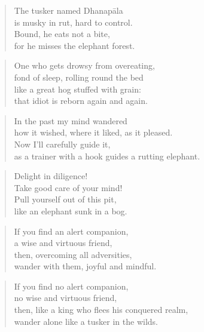 \documentclass[12pt,openany]{book}%
\begin{document}
\begin{verse}%
The tusker named \textsanskrit{Dhanapāla} \\
is musky in rut, hard to control. \\
Bound, he eats not a bite, \\
for he misses the elephant forest. 

%
\end{verse}

\begin{verse}%
One who gets drowsy from overeating, \\
fond of sleep, rolling round the bed \\
like a great hog stuffed with grain: \\
that idiot is reborn again and again. 

%
\end{verse}

\begin{verse}%
In the past my mind wandered \\
how it wished, where it liked, as it pleased. \\
Now I’ll carefully guide it, \\
as a trainer with a hook guides a rutting elephant. 

%
\end{verse}

\begin{verse}%
Delight in diligence! \\
Take good care of your mind! \\
Pull yourself out of this pit, \\
like an elephant sunk in a bog. 

%
\end{verse}

\begin{verse}%
If you find an alert companion, \\
a wise and virtuous friend, \\
then, overcoming all adversities, \\
wander with them, joyful and mindful. 

%
\end{verse}

\begin{verse}%
If you find no alert companion, \\
no wise and virtuous friend, \\
then, like a king who flees his conquered realm, \\
wander alone like a tusker in the wilds. 

%
\end{verse}
\end{document}
